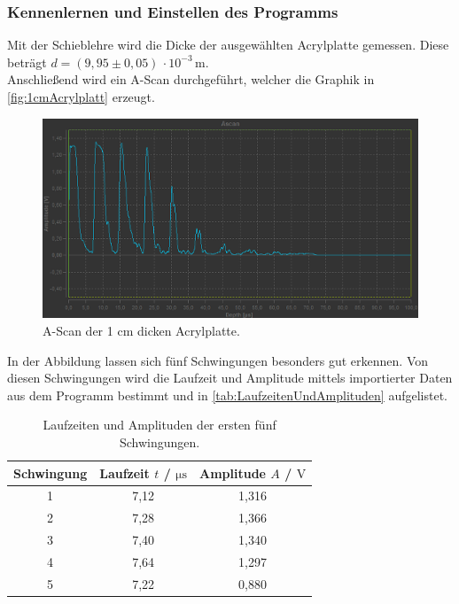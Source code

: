 \subsubsection{Kennenlernen und Einstellen des Programms}

  Mit der Schieblehre wird die Dicke der ausgewählten Acrylplatte gemessen. Diese beträgt $d=(9,95 \pm 0,05) \, \cdot 10^{-3} \, \mathrm{m}$.\\
  Anschließend wird ein A-Scan durchgeführt, welcher die Graphik in \autoref{fig:1cmAcrylplatt} erzeugt.\\
  \begin{figure}
    \centering
    \includegraphics[width=15cm]{messwerte/Vorbereitung/AScan_Vorbereitung.png}
    \caption{A-Scan der 1 cm dicken Acrylplatte.}
    \label{fig:1cmAcrylplatt}
  \end{figure}
  In der Abbildung lassen sich fünf Schwingungen besonders gut erkennen. Von diesen Schwingungen wird die Laufzeit und
  Amplitude mittels importierter Daten aus dem Programm bestimmt und in \autoref{tab:LaufzeitenUndAmplituden} aufgelistet.
  \begin{table}
    \centering
    \caption{Laufzeiten und Amplituden der ersten fünf Schwingungen.}
    \label{tab:LaufzeitenUndAmplituden}
    \begin{tabular}{c | c c}
      Schwingung & Laufzeit $t$ / $\si{\micro\second}$ & Amplitude $A$ / $\si{\volt}$ \\
        \midrule
          1 & 7,12  & 1,316 \\
          2 & 7,28  & 1,366 \\
          3 & 7,40  & 1,340 \\
          4 & 7,64  & 1,297 \\
          5 & 7,22  & 0,880 \\
        \bottomrule
      \end{tabular}
  \end{table}
